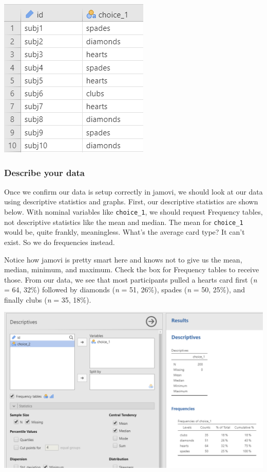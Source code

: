 \documentclass[
]{book}
\begin{document}
\includegraphics{images/09-chi-square/chi-square_data.png}

\hypertarget{describe-your-data}{%
\subsubsection{Describe your data}\label{describe-your-data}}

Once we confirm our data is setup correctly in jamovi, we should look at our data using descriptive statistics and graphs. First, our descriptive statistics are shown below. With nominal variables like \texttt{choice\_1}, we should request Frequency tables, not descriptive statistics like the mean and median. The mean for \texttt{choice\_1} would be, quite frankly, meaningless. What's the average card type? It can't exist. So we do frequencies instead.

Notice how jamovi is pretty smart here and knows not to give us the mean, median, minimum, and maximum. Check the box for Frequency tables to receive those. From our data, we see that most participants pulled a hearts card first (\emph{n} = 64, 32\%) followed by diamonds (\emph{n} = 51, 26\%), spades (\emph{n} = 50, 25\%), and finally clubs (\emph{n} = 35, 18\%).

\includegraphics{images/09-chi-square/chi-square_descriptives.png}
\end{document}
